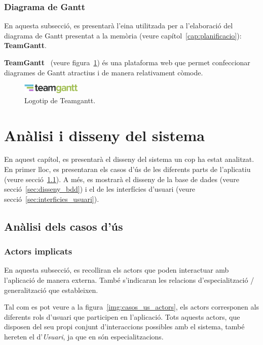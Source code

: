 \documentclass[a4paper,12pt]{ThesisStyle}
\begin{document}
\subsection{Diagrama de Gantt}
\label{subsec:decisions_memoria_gantt}

En aquesta subsecció, es presentarà l'eina utilitzada per a l'elaboració del diagrama de Gantt presentat a la memòria (veure capítol~\ref{cap:planificacio}): \textbf{TeamGantt}.

\textbf{TeamGantt}~\cite{TeamGantt} (veure figura~\ref{img:logo_teamGantt}) és una plataforma web que permet confeccionar diagrames de Gantt atractius i de manera relativament còmode.

\begin{figure}[H]
  \centering
  \includegraphics[width=0.25\textwidth]{assets/logos/teamGantt.png}
  \caption{\label{img:logo_teamGantt}Logotip de Teamgantt.}
\end{figure}


\chapter{Anàlisi i disseny del sistema}
\label{cap:analisi}

En aquest capítol, es presentarà el disseny del sistema un cop ha estat analitzat. En primer lloc, es presentaran els casos d'ús de les diferents parts de l'aplicatiu (veure secció~\ref{sec:casos_us}). A més, es mostrarà el disseny de la base de dades (veure secció~\ref{sec:disseny_bdd}) i el de les interfícies d'usuari (veure secció~\ref{sec:interficies_usuari}).

\section{Anàlisi dels casos d'ús}
\label{sec:casos_us}

\subsection{Actors implicats}
\label{subsec:casos_us_actors}

En aquesta subsecció, es recolliran els actors que poden interactuar amb l'aplicació de manera externa. També s'indicaran les relacions d'especialització / generalització que estableixen.

Tal com es pot veure a la figura~\ref{img:casos_us_actors}, els actors corresponen als diferents rols d'usuari que participen en l'aplicació. Tots aquests actors, que disposen del seu propi conjunt d'interaccions possibles amb el sistema, també hereten el d'\emph{Usuari}, ja que en són especialitzacions.
\end{document}
